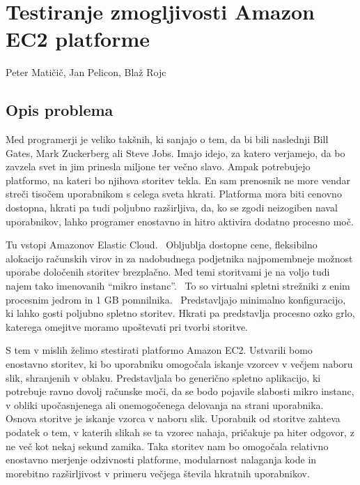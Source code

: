 \chapter[Testiranje zmogljivosti Amazon EC2 platforme (P. Matičič, J. Pelicon, B. Rojc)]{Testiranje zmogljivosti Amazon EC2 platforme}

\pagestyle{fancy}
\fancyhf{}
\fancyhead[LE,RO]{\thepage}
\fancyhead[RE,LO]{\leftmark}

\huge Peter Matičič, Jan Pelicon, Blaž Rojc
\normalsize
\bigskip

\section{Opis problema}

Med programerji je veliko takšnih, ki sanjajo o tem, da bi bili naslednji Bill Gates, Mark Zuckerberg ali Steve Jobs.
Imajo idejo, za katero verjamejo, da bo zavzela svet in jim prinesla miljone ter večno slavo.
Ampak potrebujejo platformo, na kateri bo njihova storitev tekla.
En sam prenosnik ne more vendar streči tisočem uporabnikom s celega sveta hkrati.
Platforma mora biti cenovno dostopna, hkrati pa tudi poljubno razširljiva, da, ko se zgodi neizogiben naval uporabnikov, lahko programer enostavno in hitro aktivira dodatno procesno moč.

Tu vstopi Amazonov Elastic Cloud.~\cite{aws_amazon_ec2} 
Obljublja dostopne cene, fleksibilno alokacijo računskih virov in za nadobudnega podjetnika najpomembneje možnost uporabe določenih storitev brezplačno.
Med temi storitvami je na voljo tudi najem tako imenovanih ``mikro instanc''.~\cite{aws_amazon_free} 
To so virtualni spletni strežniki z enim procesnim jedrom in 1 GB pomnilnika.~\cite{aws_amazon_instances}
Predstavljajo minimalno konfiguracijo, ki lahko gosti poljubno spletno storitev.
Hkrati pa predstavlja procesno ozko grlo, katerega omejitve moramo upoštevati pri tvorbi storitve.

S tem v mislih želimo stestirati platformo Amazon EC2.
Ustvarili bomo enostavno storitev, ki bo uporabniku omogočala iskanje vzorcev v večjem naboru slik, shranjenih v oblaku.
Predstavljala bo generično spletno aplikacijo, ki potrebuje ravno dovolj računske moči, da se bodo pojavile slabosti mikro instanc, v obliki upočasnjenega ali onemogočenega delovanja na strani uporabnika.
Osnova storitve je iskanje vzorca v naboru slik.
Uporabnik od storitve zahteva podatek o tem, v katerih slikah se ta vzorec nahaja, pričakuje pa hiter odgovor, z ne več kot nekaj sekund zamika.
Taka storitev nam bo omogočala relativno enostavno merjenje odzivnosti platforme, modularnost nalaganja kode in morebitno razširljivost v primeru večjega števila hkratnih uporabnikov.

